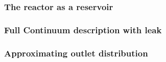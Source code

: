 \subsubsection{The reactor as a reservoir}

\newpage

\subsubsection{Full Continuum description with leak}

\newpage

\subsubsection{Approximating outlet distribution}
